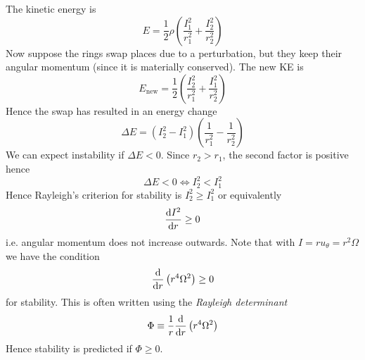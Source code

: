 \documentclass{jknotes}
\begin{document}
The kinetic energy is
\begin{equation}
	E = \frac{1}{2}\rho\left(\frac{I_1^2}{r_1^2} + \frac{I_2^2}{r_2^2}\right)
\end{equation}
Now suppose the rings swap places due to a perturbation, but they keep their
angular momentum (since it is materially conserved). The new KE is
\begin{equation}
	E_{\text{new}} = \frac{1}{2} \left( 
	\frac{I_2^2}{r_1^2} + \frac{I_1^2}{r_2^2}\right)
\end{equation}
Hence the swap has resulted in an energy change
\begin{equation}
	\Delta E = (I_2^2-I_1^2)\left(\frac{1}{r_1^2} - \frac{1}{r_2^2}\right)
\end{equation}
We can expect instability if $\Delta E < 0$. Since $r_2 > r_1$, the second
factor is positive hence
\begin{equation}
	\Delta E < 0 \iff I_2^2 < I_1^2
\end{equation}
Hence Rayleigh's criterion for stability is $I_2^2 \ge I_1^2$ or equivalently
\begin{equation}
	\frac{\diffd I^2}{\diffd r} \ge 0
\end{equation}
i.e. angular momentum does not increase outwards. Note that with $I =
ru_\theta = r^2 \Omega$ we have the condition
\begin{equation}
	\frac{\diffd}{\diffd r}\left( r^4 \Omega^2 \right) \ge 0
\end{equation}
for stability. This is often written using the \emph{Rayleigh determinant}
\begin{equation}
	\Phi \equiv \frac{1}{r}
	\frac{\diffd}{\diffd r}\left( r^4 \Omega^2 \right)
\end{equation}
Hence stability is predicted if $\Phi \ge 0$.
\end{document}

